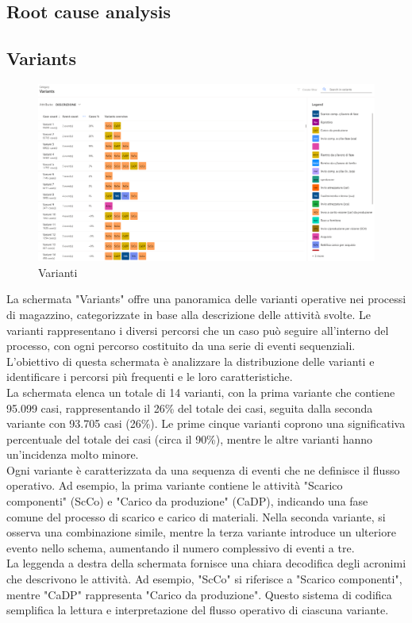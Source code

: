 \documentclass{article}
\begin{document}
\subsection{Root cause analysis}

\subsection{Variants}
\begin{figure}[H]
    \centering
    \includegraphics[width=\textwidth]{imgMicrosoft/DatiReali/VariantsDatiReali.png}
    \caption{Varianti}
    \label{fig:variants}
\end{figure}
La schermata "Variants" offre una panoramica delle varianti operative nei processi di magazzino, categorizzate in base alla descrizione delle attività svolte. Le varianti rappresentano i diversi percorsi che un caso può seguire all'interno del processo, con ogni percorso costituito da una serie di eventi sequenziali. L'obiettivo di questa schermata è analizzare la distribuzione delle varianti e identificare i percorsi più frequenti e le loro caratteristiche.\\
La schermata elenca un totale di 14 varianti, con la prima variante che contiene 95.099 casi, rappresentando il 26\% del totale dei casi, seguita dalla seconda variante con 93.705 casi (26\%). Le prime cinque varianti coprono una significativa percentuale del totale dei casi (circa il 90\%), mentre le altre varianti hanno un'incidenza molto minore.\\
Ogni variante è caratterizzata da una sequenza di eventi che ne definisce il flusso operativo. Ad esempio, la prima variante contiene le attività "Scarico componenti" (ScCo) e "Carico da produzione" (CaDP), indicando una fase comune del processo di scarico e carico di materiali. Nella seconda variante, si osserva una combinazione simile, mentre la terza variante introduce un ulteriore evento nello schema, aumentando il numero complessivo di eventi a tre.\\
La leggenda a destra della schermata fornisce una chiara decodifica degli acronimi che descrivono le attività. Ad esempio, "ScCo" si riferisce a "Scarico componenti", mentre "CaDP" rappresenta "Carico da produzione". Questo sistema di codifica semplifica la lettura e interpretazione del flusso operativo di ciascuna variante.\\
\end{document}
